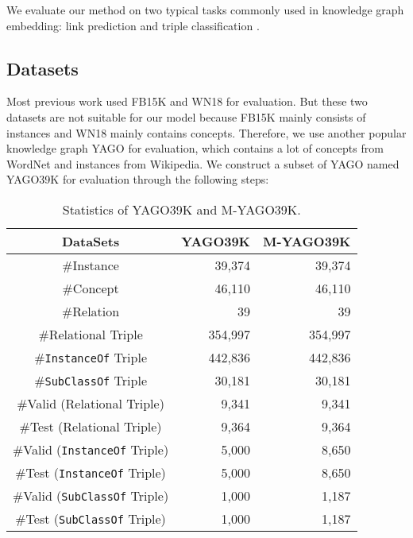 \documentclass[11pt,a4paper]{article}
\begin{document}
  We evaluate our method on two typical tasks commonly used in knowledge graph embedding: link prediction \cite{TransE} and triple classification
  \cite{NTN}. 
  
  \subsection{Datasets}
  
  Most previous work used FB15K and WN18 \cite{TransE} for evaluation.
  But these two datasets are not suitable for our model because FB15K mainly consists of instances and WN18 mainly contains concepts.
  Therefore, we use another popular knowledge graph YAGO \cite{YAGO} for evaluation, which contains a lot of concepts from WordNet and instances from Wikipedia. 
  We construct a subset of YAGO named YAGO39K for evaluation through the following steps:
  
  \begin{table}
    \small
    \centering
    \setlength\tabcolsep{2pt}
  \begin{tabular}{|c|r|r|}
    \hline
    {DataSets} & {YAGO39K} & {M-YAGO39K}\\\hline
    \#Instance & {39,374} & {39,374}\\ 
    \#Concept & {46,110} & {46,110}\\ 
    \#Relation & {39} & {39}\\ 
    \#Relational Triple & {354,997} & {354,997}\\ 
    \#\texttt{InstanceOf} Triple & {442,836} & {442,836}\\ 
    \#\texttt{SubClassOf} Triple & {30,181} & {30,181}\\\hline
    \#Valid (Relational Triple) & {9,341} & {9,341}\\ 
    \#Test (Relational Triple) & {9,364} & {9,364}\\ 
    \#Valid (\texttt{InstanceOf} Triple) & {5,000} & {8,650}\\ 
    \#Test (\texttt{InstanceOf} Triple) & {5,000} & {8,650}\\ 
    \#Valid (\texttt{SubClassOf} Triple) & {1,000} & {1,187}\\
    \#Test (\texttt{SubClassOf} Triple) & {1,000} & {1,187}\\
    \hline 
    \end{tabular}
    \caption{\label{table1}Statistics of YAGO39K and M-YAGO39K.}
    \end{table}
    
\end{document}
